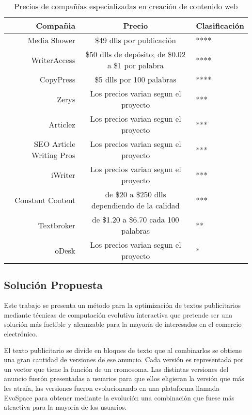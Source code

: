 \begin{table}
\caption{Precios de compañías especializadas en creación de contenido web}
\label{precios}
\begin{center}
\begin{tabular}{|r|c|l|}
Compañia & Precio & Clasificación \\\hline \hline

Media Shower	 & \$49 dlls por publicación & ****\\
WriterAccess & \$50 dlls de depósito; de \$0.02 a \$1 por palabra & ****\\
CopyPress	 & \$5 dlls por 100 palabras & ****\\
Zerys	 & Los precios varian segun el proyecto & ***\\
Articlez & Los precios varian segun el proyecto & ***\\
SEO Article Writing Pros & Los precios varian segun el proyecto & ***\\
iWriter	 & Los precios varian segun el proyecto & ***\\
Constant Content	 & de \$20 a \$250 dlls dependiendo de la calidad & ***\\
Textbroker & de \$1.20 a \$6.70 cada 100 palabras & **\\
oDesk	 & Los precios varian segun el proyecto & *\\

\end{tabular}
\end{center}
\end{table}


\subsection{Solución Propuesta}

Este trabajo se presenta un método para la optimización de textos publicitarios mediante técnicas de computación evolutiva interactiva que pretende ser una solución más factible y alcanzable para la mayoría de interesados en el comercio electrónico.

El texto publicitario se divide en bloques de texto que al combinarlos se obtiene una gran cantidad de versiones de ese anuncio. Cada versión es representada por un vector que tiene la función de un cromosoma. Las distintas versiones del anuncio fuerón presentadas a usuarios para que ellos eligieran la versión que más les atraía, las versiones fueron evolucionando en una plataforma llamada EvoSpace para obtener mediante la evolución una combinación que fuese más atractiva para la mayoría de los usuarios. 

